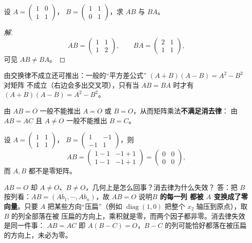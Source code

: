 \begin{example}
设 $A=\begin{pmatrix} 1 & 0 \\ 1 & 1 \end{pmatrix}$，
$B=\begin{pmatrix} 1 & 1 \\ 0 & 1 \end{pmatrix}$，求 $AB$ 与 $BA$。
\end{example}
\begin{proof}[解]
\[
  AB=\begin{pmatrix} 1 & 1 \\ 1 & 2 \end{pmatrix},
  \qquad
  BA=\begin{pmatrix} 2 & 1 \\ 1 & 1 \end{pmatrix},
\]
可见 $AB\neq BA$。
\end{proof}

由交换律不成立还可推出：一般的“平方差公式” $(A+B)(A-B)=A^2-B^2$ 对矩阵
不成立（右边会多出交叉项），只有当 $AB=BA$ 时才有 $(A+B)(A-B)=A^2-B^2$。

\begin{remark}\label{rmk:no-cancel}
由 $AB=O$ 一般不能推出 $A=O$ 或 $B=O$，从而矩阵乘法\textbf{不满足消去律}：
由 $AB=AC$ 且 $A\neq O$ 一般不能推出 $B=C$。
\end{remark}

\begin{example}
设 $A=\begin{pmatrix} 1 & 1 \\ 1 & 1 \end{pmatrix}$，
$B=\begin{pmatrix} 1 & -1 \\ -1 & 1 \end{pmatrix}$，则
\[
  AB=\begin{pmatrix} 1-1 & -1+1 \\ 1-1 & -1+1 \end{pmatrix}
    =\begin{pmatrix} 0 & 0 \\ 0 & 0 \end{pmatrix},
\]
而 $A,B$ 都不是零矩阵。
\end{example}

\begin{qa}{$AB=O$ 却 $A\neq O$、$B\neq O$，几何上是怎么回事？消去律为什么失效？}
答：把 $B$ 按列看：$AB=(Ab_1,\cdots,Ab_n)$，故 $AB=O$ 说明\textbf{$B$ 的每一列
都被 $A$ 变换成了零向量}。只要 $A$ 把某些方向“压扁”（例如
$\operatorname{diag}(1,0)$ 把整个 $x_2$ 轴压到原点），取 $B$ 的列全部落在被
压扁的方向上，乘积就是零，而两个因子都非零。消去律失效是同一件事：
$AB=AC$ 即 $A(B-C)=O$，$B-C$ 的列可能恰好都落在被压扁的方向上，未必为零。
\end{qa}

